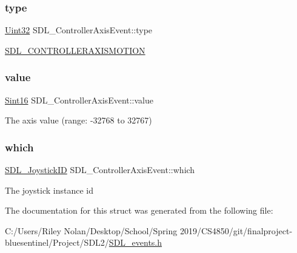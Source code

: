 \subsubsection{\texorpdfstring{type}{type}}
{\footnotesize\ttfamily \mbox{\hyperlink{_s_d_l__stdinc_8h_add440eff171ea5f55cb00c4a9ab8672d}{Uint32}} S\+D\+L\+\_\+\+Controller\+Axis\+Event\+::type}

\mbox{\hyperlink{_s_d_l__events_8h_a3b589e89be6b35c02e0dd34a55f3fccaaca6330126f4126f6a45454fa046c25f3}{S\+D\+L\+\_\+\+C\+O\+N\+T\+R\+O\+L\+L\+E\+R\+A\+X\+I\+S\+M\+O\+T\+I\+ON}} \mbox{\label{struct_s_d_l___controller_axis_event_a1ed7f14255ed01b982d40a38791d475a}} 
\subsubsection{\texorpdfstring{value}{value}}
{\footnotesize\ttfamily \mbox{\hyperlink{_s_d_l__stdinc_8h_a9d0257032c0e146ab6121bf0122712f5}{Sint16}} S\+D\+L\+\_\+\+Controller\+Axis\+Event\+::value}

The axis value (range\+: -\/32768 to 32767) \mbox{\label{struct_s_d_l___controller_axis_event_a07087f68ea9d64b50047d65312ee7b94}} 
\subsubsection{\texorpdfstring{which}{which}}
{\footnotesize\ttfamily \mbox{\hyperlink{_s_d_l__joystick_8h_a3c3d32500cb08f76ee8077983912c0bd}{S\+D\+L\+\_\+\+Joystick\+ID}} S\+D\+L\+\_\+\+Controller\+Axis\+Event\+::which}

The joystick instance id 

The documentation for this struct was generated from the following file\+:\begin{DoxyCompactItemize}
\item 
C\+:/\+Users/\+Riley Nolan/\+Desktop/\+School/\+Spring 2019/\+C\+S4850/git/finalproject-\/bluesentinel/\+Project/\+S\+D\+L2/\mbox{\hyperlink{_s_d_l__events_8h}{S\+D\+L\+\_\+events.\+h}}\end{DoxyCompactItemize}
